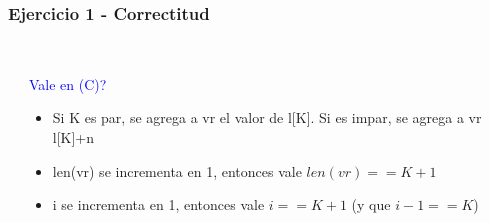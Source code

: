 \begin{frame}[fragile]\frametitle{Ejercicio 1 - Correctitud}
\begin{columns}
\begin{column}{0.35\textwidth}

\end{column}
\begin{column}{0.65\textwidth}

\\
\textcolor{blue}{Vale \I en (C)?}
\begin{itemize}
  \item Si K es par, se agrega a vr el valor de l[K]. Si es impar, se agrega a vr l[K]+n
  \item len(vr) se incrementa en 1, entonces vale $len(vr) == K + 1$
  \item i se incrementa en 1, entonces vale $i == K + 1$ (y que $i-1 == K$)
\end{itemize}

\end{column}
\end{columns}
\end{frame}


